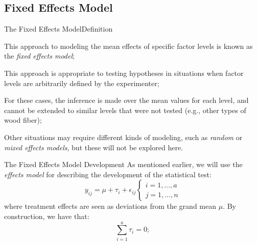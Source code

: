 \subsection{Fixed Effects Model}
\begin{frame}
{The Fixed Effects Model}{Definition}

This approach to modeling the mean effects of specific factor levels is known as the \textit{fixed effects model};
\bigskip

This approach is appropriate to testing hypotheses in situations when factor levels are arbitrarily defined by the experimenter;\bigskip

For these cases, the inference is made over the mean values for each level, and cannot be extended to similar levels that were not tested (e.g., other types of wood fiber);\bigskip

Other situations may require different kinds of modeling, such as \textit{random} or \textit{mixed effects models}, but these will not be explored here.
\end{frame}


\begin{frame}
{The Fixed Effects Model}
{Development}
As mentioned earlier, we will use the \textit{effects model} for describing the development of the statistical test:
\begin{equation*}
y_{ij} = \mu + \tau_i + \epsilon_{ij}\begin{cases}i=1,\ldots,a\\j=1,\ldots,n\end{cases}
\end{equation*}
\noindent where treatment effects are seen as deviations from the grand mean $\mu$.
\bigskip
By construction, we have that:
\begin{equation*}
\sum_{i=1}^{a}\tau_i = 0;
\end{equation*}
\end{frame}

